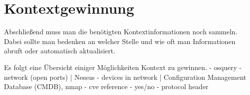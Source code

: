 \section{Kontextgewinnung}
Abschließend muss man die benötigten Kontextinformationen noch sammeln.
Dabei sollte man bedenken an welcher Stelle und wie oft man Informationen abruft oder automatisch aktualisiert. \cite{perera_context_2014}

  Es folgt eine Übersicht einiger Möglichkeiten Kontext zu gewinnen.    
- osquery
- network (open ports) | Nessus
- devices in network | Configuration Management Database (CMDB), nmap   
- cve reference - yes/no
- protocol header

